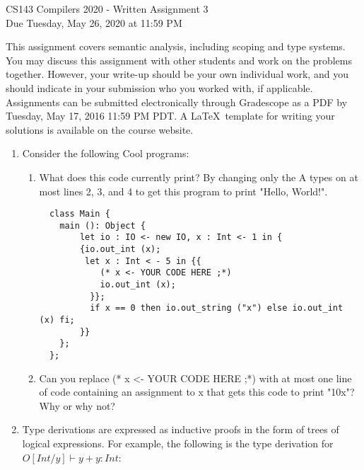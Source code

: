 \documentclass[11pt]{article}
\begin{document}
\begin{center}
\LARGE CS143 Compilers 2020 - Written Assignment 3 \\
\large Due Tuesday, May 26, 2020 at 11:59 PM
\end{center}

This assignment covers semantic analysis, including scoping and type systems. You may discuss this assignment with other students and work on the problems together. However, your write-up should be your own individual work, and you should indicate in your submission who you worked with, if applicable. Assignments can be submitted electronically through Gradescope as a PDF by Tuesday, May 17, 2016 11:59 PM PDT. A \LaTeX \ template for writing your solutions is available on the course website.

\begin{enumerate}
  \item Consider the following Cool programs:
  \begin{enumerate}
  \begin{lstlisting}
    class A {
        x: A; -- line 2
        baz() : A {{x <- new A; x;}}; -- line 3
        bar(): A {new A}; -- line 4
        foo(): String {"World!"};
    }; 
    class B inherits A {
        foo() : String {" "};
    };
    
    class C inherits A {
        foo() : String {"Hello,"};
    };
    
    class Main {
        main (): Object {
            let io : IO <- new IO, b : B <- new B, c : C <- new C in {{
                io.out_string (c.baz().foo());
                io.out_string(b.baz().baz().foo());
                io.out_string (b.bar().baz().foo());
            }} 
        };
    };
    
  \end{lstlisting}
        \item What does this code currently print? By changing only the A types on at most lines 2, 3, and 4 to get this program to print "Hello, World!". 
        
        \newpage
  \begin{lstlisting}
  class Main {
    main (): Object {
        let io : IO <- new IO, x : Int <- 1 in {
        {io.out_int (x);
         let x : Int < - 5 in {{
            (* x <- YOUR CODE HERE ;*)
            io.out_int (x);
          }};
          if x == 0 then io.out_string ("x") else io.out_int (x) fi;
        }}
    };
  };
  \end{lstlisting}
  \item Can you replace (* x <- YOUR CODE HERE ;*) with at most one line of code containing an assignment to x that gets this code to print "10x"? Why or why not?
  \end{enumerate}
  \newpage
  \item Type derivations are expressed as inductive proofs in the form of trees of logical expressions. For example, the following is the type derivation for $O[Int/y] \vdash y + y: Int$: \\
  

\end{enumerate}
\end{document}
